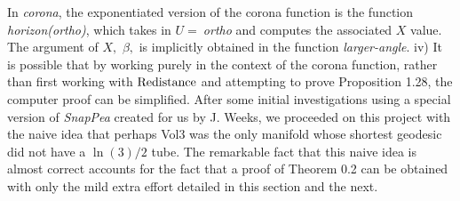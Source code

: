 In {\it corona}, the exponentiated version of the corona function is the
function {\it horizon(ortho)}, which  takes in $U=\ ${\it ortho} and
computes the associated $X$ value.  The argument of $X,$ $\beta,$  is
implicitly obtained in the function {\it larger\/{\rm -}\/angle}.
iv) It is possible that by working purely in the context of the corona function, rather than first working with ${\rm Redistance}$ and attempting to prove
Proposition 1.28, the computer proof can be simplified.
After some initial investigations using a special version of {\it SnapPea}
created for us by J. Weeks, we proceeded on  this
project with the naive idea that perhaps Vol3 was the only manifold whose
shortest geodesic did not have a $\ln(3)/2$ tube.  The remarkable fact that this
naive idea is almost correct accounts for the fact that a proof of Theorem 0.2
can be obtained with only the mild extra effort detailed in this section
and the next.
 









